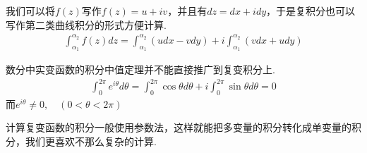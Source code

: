 \documentclass[lang=cn, titlestyle=display, scheme=chinese]{elegantbook}
\begin{document}
                我们可以将$f(z)$写作$f(z) = u + iv$，并且有$dz = dx + idy$，于是复积分也可以写作第二类曲线积分的形式方便计算.
                \begin{align}
                    \int_{\alpha_1}^{\alpha_2}f(z)dz = \int_{\alpha_1}^{\alpha_2}(udx - vdy) + i \int_{\alpha_1}^{\alpha_2}(vdx + udy)
                \end{align}

                \begin{remark}
                    数分中实变函数的积分中值定理并不能直接推广到复变积分上.
                    \begin{align*}
                        \int_{0}^{2\pi}e^{i\theta}d\theta = \int_{0}^{2\pi}\cos{\theta}d\theta + i \int_{0}^{2\pi}\sin{\theta}d\theta = 0
                    \end{align*}
                    而$e^{i\theta} \neq 0, \quad (0 < \theta < 2\pi)$
                \end{remark}

                计算复变函数的积分一般使用参数法，这样就能把多变量的积分转化成单变量的积分，我们更喜欢不那么复杂的计算.
\end{document}
